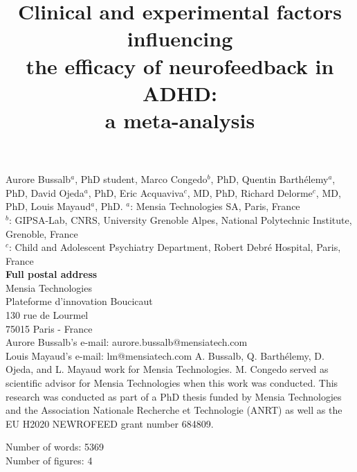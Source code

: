 

\title{Clinical and experimental factors influencing \\ the efficacy of neurofeedback in ADHD: \\ a meta-analysis} %
\maketitle
\noindent Aurore Bussalb$^a$, PhD student, Marco Congedo$^b$, PhD, Quentin Barth\'elemy$^a$, PhD, David Ojeda$^a$, PhD, 
Eric Acquaviva$^c$, MD, PhD, Richard Delorme$^c$, MD, PhD, Louis Mayaud$^a$, PhD. 
\smallbreak
\noindent $^a$: Mensia Technologies SA, Paris, France \\
\noindent $^b$: GIPSA-Lab, CNRS, University Grenoble Alpes, National Polytechnic Institute, Grenoble, France \\
\noindent $^c$: Child and Adolescent Psychiatry Department, Robert Debré Hospital, Paris, France \\ 
\smallbreak
\noindent\textbf{Full postal address} \\
Mensia Technologies \\
Plateforme d'innovation Boucicaut \\
130 rue de Lourmel \\
75015 Paris - France \\
Aurore Bussalb's e-mail: aurore.bussalb@mensiatech.com \\
Louis Mayaud's e-mail: lm@mensiatech.com 
\smallbreak
\noindent A. Bussalb, Q. Barth\'elemy, D. Ojeda, and L. Mayaud work for Mensia Technologies.
M. Congedo served as scientific advisor for Mensia Technologies when this work was conducted. 
\smallbreak
\noindent This research was conducted as part of a PhD thesis funded by Mensia Technologies and the Association Nationale 
Recherche et Technologie (ANRT) as well as the EU H2020 NEWROFEED grant number 684809.

\noindent Number of words: 5369 \\
\noindent Number of figures: 4 
